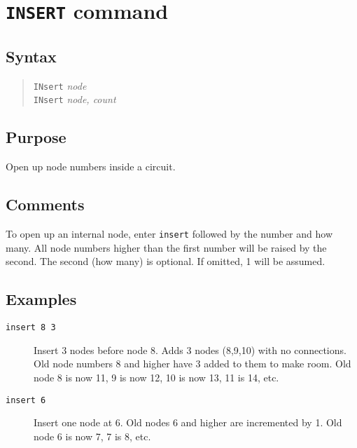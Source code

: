 \section{{\tt INSERT} command}
\subsection{Syntax}
\begin{verse}
{\tt INsert} {\it node}\\
{\tt INsert} {\it node, count}
\end{verse}
\subsection{Purpose}

Open up node numbers inside a circuit.
\subsection{Comments}

To open up an internal node, enter {\tt insert} followed by the number and
how many.  All node numbers higher than the first number will be raised by
the second.  The second (how many) is optional.  If omitted, 1 will be
assumed.
\subsection{Examples}

\begin{description}

\item[{\tt insert 8 3}] Insert 3 nodes before node 8.  Adds 3 nodes (8,9,10)
with no connections.  Old node numbers 8 and higher have 3 added to them to
make room.  Old node 8 is now 11, 9 is now 12, 10 is now 13, 11 is 14, etc.

\item[{\tt insert 6}] Insert one node at 6.  Old nodes 6 and higher are
incremented by 1.  Old node 6 is now 7, 7 is 8, etc.

\end{description}
